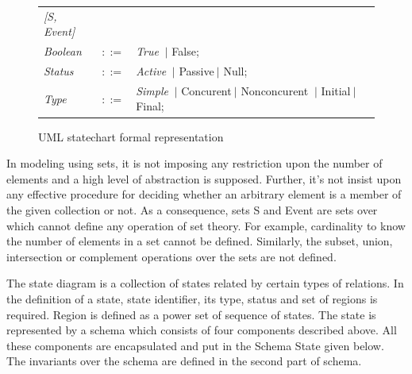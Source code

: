 \begin{figure}[ht!]
	\centering
	\begin{tabular}{lll}
		\footnotesize                       
		\textit{[S, Event]}          &\footnotesize \\
		
		\footnotesize
		\textit{Boolean}            &\footnotesize $::=$         &\footnotesize \textit{True} $\ \vert $ {False};       \\   
		\footnotesize
		\textit{Status}            &\footnotesize $::=$         &\footnotesize \textit{Active}
		 $\ \vert $ {Passive}$\ \vert $ {Null};       \\ 
		\footnotesize
		\textit{Type}            &\footnotesize $::=$         &\footnotesize \textit{Simple}
		 	$\ \vert $ {Concurent}$\ \vert $ {Nonconcurent} $\ \vert $ {Initial}$\ \vert $ {Final};       \\	 	 
		
	\end{tabular}
	\vspace{1em}
	\caption{UML statechart formal representation}
	\label{statechart_formal_representation}
\end{figure}

In modeling using sets, it is not imposing any restriction upon the number of elements and a high level of
abstraction is supposed. Further, it's not insist upon any
effective procedure for deciding whether an arbitrary
element is a member of the given collection or not. As a
consequence, sets S and Event are sets over which cannot define any operation of set theory. For example,
cardinality to know the number of elements in a set cannot
be defined. Similarly, the subset, union, intersection or
complement operations over the sets are not defined.

The state diagram is a collection of states related by
certain types of relations. In the definition of a state, state identifier, its type, status and set of regions is required. Region is defined as a power set of sequence of states. The state is represented by a schema which consists of four components described above. All these components are encapsulated and put in the Schema State given below.
The invariants over the schema are defined in the second
part of schema.

